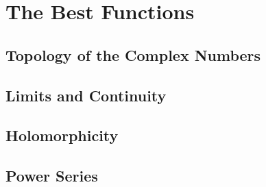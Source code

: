 \section{The Best Functions}

\subsection{Topology of the Complex Numbers}

\subsection{Limits and Continuity}

\subsection{Holomorphicity}

\subsection{Power Series}